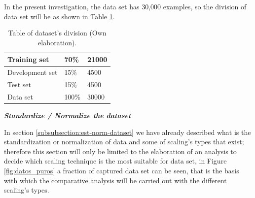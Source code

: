 In the present investigation, the data set has 30,000 examples, so the division of data set will be as shown in Table \ref{table:division-dataset}.

\begin{table}[]
\centering
\begin{tabular}{|l|l|l|}
\hline
Training set & 70\%  & 21000 \\ \hline
Development set    & 15\%  & 4500  \\ \hline
Test set       & 15\%  & 4500  \\ \hline
Data set       & 100\% & 30000 \\ \hline
\end{tabular}
\caption{Table of dataset's division (Own elaboration).}
\label{table:division-dataset}
\end{table}

\vspace{5mm} %

\textbf{\textit{Standardize / Normalize the dataset}}

\vspace{5mm} %

In section \ref{subsubsection:est-norm-dataset} we have already described what is the standardization or normalization of data and some of scaling's types that exist; therefore this section will only be limited to the elaboration of an analysis to decide which scaling technique is the most suitable for data set, in Figure \ref{fig:datos_puros} a fraction of captured data set can be seen, that is the basis with which the comparative analysis will be carried out with the different scaling's types.

